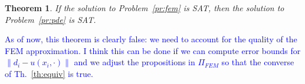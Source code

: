 \documentclass{article}
\newtheorem{theorem}{Theorem}
\newcommand*{\fran}[1]{\textcolor{blue}{#1}}
\begin{document}
\begin{theorem}
    If the solution to Problem~\ref{pr:fem} is SAT, then the solution to
    Problem~\ref{pr:pde} is SAT.
\end{theorem}

\fran{As of now, this theorem is clearly false: we need to account for the
quality of the FEM approximation. I think this can be done if 
we can compute error bounds for $\|d_i - u(x_i, \cdot)\|$ and we adjust the
propositions in $\Pi_{FEM}$ so that the converse of Th.~\ref{th:equiv} is true.}
\end{document}
